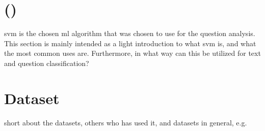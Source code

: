 \section{ ()}
\label{sec:svm}
\gls{svm} is the chosen \gls{ml} algorithm that was chosen to use for the question analysis. This 
section is mainly intended as a light introduction to what \gls{svm} is, and what the most common 
uses are. Furthermore, in what way can this be utilized for text and question classification?

\section{Dataset}
\label{sec:dataset}
short about the datasets, others who has used it, and datasets in general, e.g. 
\cite{Klein2016,SpaceMachine.net2016,Wissner-Gross2016}
